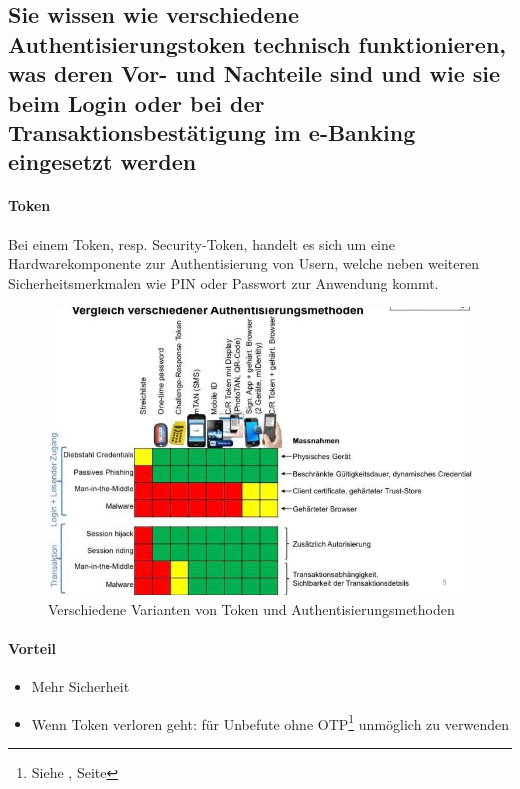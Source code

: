 \documentclass[10pt,a4paper]{article}
\begin{document}
\subsection*{Sie wissen wie verschiedene Authentisierungstoken technisch funktionieren, was deren Vor- und Nachteile sind und wie sie beim Login oder bei der Transaktionsbestätigung im e-Banking eingesetzt werden}
\paragraph*{Token}Bei einem Token, resp. Security-Token, handelt es sich um eine Hardwarekomponente zur Authentisierung von Usern, welche neben weiteren Sicherheitsmerkmalen wie PIN oder Passwort zur Anwendung kommt.

\begin{figure}[H]
    \begin{center}
    \includegraphics[width=16cm]{images/token.png}
    \caption{Verschiedene Varianten von Token und Authentisierungsmethoden}
    \label{token}
    \end{center}
\end{figure}
\paragraph*{Vorteil}
\begin{itemize}[noitemsep,topsep=0pt,leftmargin=*]
    \item Mehr Sicherheit
    \item Wenn Token verloren geht: für Unbefute ohne OTP\footnote{Siehe \underline{}, Seite \pageref{para:One-Time Pad}} unmöglich zu verwenden
\end{itemize}
\end{document}
